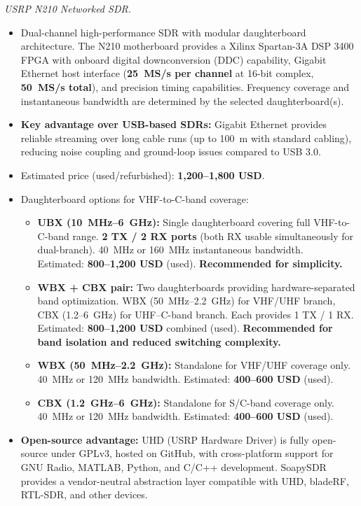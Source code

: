\documentclass[11pt,a4paper]{article}
\newcommand{\blue}[1]{\textcolor{priceblue}{\textbf{#1}}}
\newcommand{\gc}{\textbullet}
\begin{document}
	\medskip
	\noindent
	\textit{USRP N210 Networked SDR.}
	\begin{itemize}
		\item Dual-channel high-performance SDR with modular daughterboard architecture.
		The N210 motherboard provides a Xilinx Spartan-3A DSP 3400 FPGA with onboard
		digital downconversion (DDC) capability, Gigabit Ethernet host interface
		(\textbf{25~MS/s per channel} at 16-bit complex, \textbf{50~MS/s total}), and
		precision timing capabilities. Frequency coverage and instantaneous bandwidth are
		determined by the selected daughterboard(s).
		\item \textbf{Key advantage over USB-based SDRs:} Gigabit Ethernet provides
		reliable streaming over long cable runs (up to 100~m with standard cabling),
		reducing noise coupling and ground-loop issues compared to USB 3.0.
		\item Estimated price (used/refurbished): \blue{1,200--1,800 USD}.
		\href{https://www.ebay.com/itm/306170204276}{\gc}
		\item Daughterboard options for VHF-to-C-band coverage:
		\begin{itemize}
			\item \textbf{UBX (10~MHz--6~GHz):} Single daughterboard covering full
			VHF-to-C-band range. \textbf{2 TX / 2 RX ports} (both RX usable simultaneously
			for dual-branch). 40~MHz or 160~MHz instantaneous bandwidth. \\
			Estimated: \blue{800--1,200 USD} (used). \textbf{Recommended for simplicity.}
			\item \textbf{WBX + CBX pair:} Two daughterboards providing hardware-separated
			band optimization. WBX (50~MHz--2.2~GHz) for VHF/UHF branch, CBX (1.2--6~GHz)
			for UHF--C-band branch. Each provides 1 TX / 1 RX. \\
			Estimated: \blue{800--1,200 USD} combined (used). \textbf{Recommended for
				band isolation and reduced switching complexity.}
			\item \textbf{WBX (50~MHz--2.2~GHz):} Standalone for VHF/UHF coverage only.
			40~MHz or 120~MHz bandwidth. Estimated: \blue{400--600 USD} (used).
			\item \textbf{CBX (1.2~GHz--6~GHz):} Standalone for S/C-band coverage only.
			40~MHz or 120~MHz bandwidth. Estimated: \blue{400--600 USD} (used).
		\end{itemize}
		\item \textbf{Open-source advantage:} UHD (USRP Hardware Driver) is fully
		open-source under GPLv3, hosted on GitHub, with cross-platform support for
		GNU Radio, MATLAB, Python, and C/C++ development. SoapySDR provides a
		vendor-neutral abstraction layer compatible with UHD, bladeRF, RTL-SDR, and
		other devices.
	\end{itemize}
	
\end{document}
